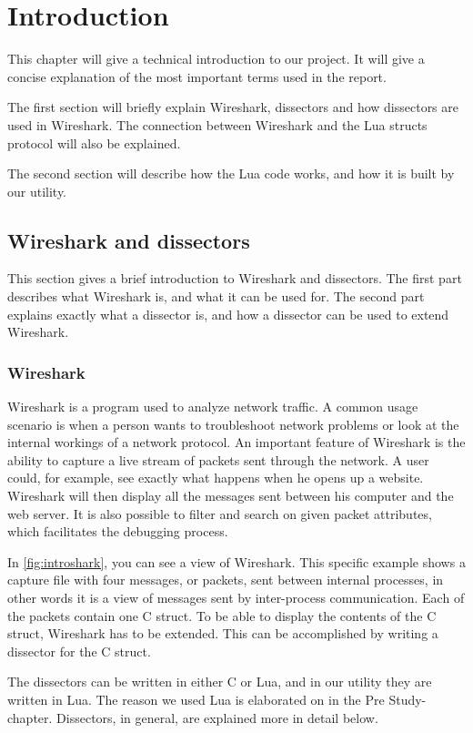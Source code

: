 \chapter{Introduction}

This chapter will give a technical introduction to our project.
It will give a concise explanation of the most important terms used in the report.

The first section will briefly explain Wireshark, dissectors and how dissectors are used in Wireshark.
The connection between Wireshark and the Lua structs protocol will also be explained.

The second section will describe how the Lua code works, and how it is built by our utility.

\section{Wireshark and dissectors}
This section gives a brief introduction to Wireshark and dissectors.
The first part describes what Wireshark is, and what it can be used for.
The second part explains exactly what a dissector is, and how a dissector can be used to extend Wireshark.

\subsection{Wireshark}
Wireshark is a program used to analyze network traffic. A common usage scenario is when a person wants to troubleshoot network problems or
look at the internal workings of a network protocol. An important feature of Wireshark is the ability to capture a live stream of packets sent through the network. 
A user could, for example, see exactly what happens when he opens up a website. Wireshark will then display all the messages
sent between his computer and the web server. It is also possible to filter and search on given packet attributes, which facilitates the debugging process.

In \autoref{fig:introshark}, you can see a view of Wireshark.
This specific example shows a capture file with four messages, or packets, sent between internal processes, in other words
it is a view of messages sent by inter-process communication. Each of the packets contain one C struct.
To be able to display the contents of the C struct, Wireshark has to be extended. 
This can be accomplished by writing a dissector for the C struct.

The dissectors can be written in either C or Lua, and in our utility they are written in Lua.
The reason we used Lua is elaborated on in the Pre Study-chapter.
Dissectors, in general, are explained more in detail below.

